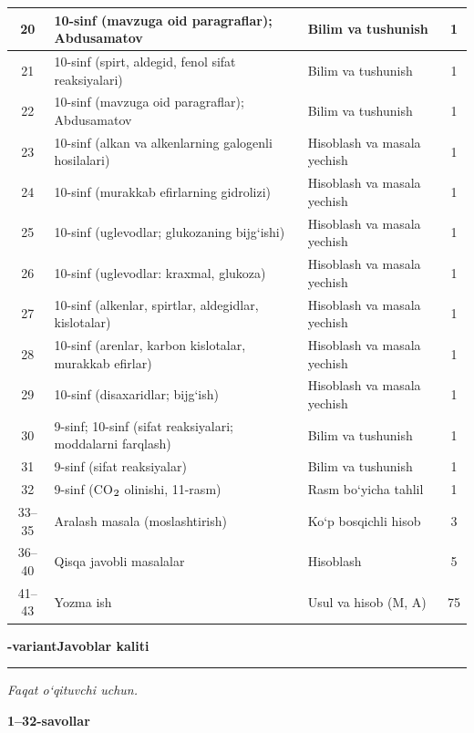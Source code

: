 \documentclass[11pt,a4paper]{article}
\renewcommand{\textsubscript}[1]{\ensuremath{_{\text{\fontsize{8}{8}\selectfont #1}}}}
\newcommand{\hdrpill}[1]{\begin{tikzpicture}[baseline=0pt]\node[fill=ygreen,text=white,rounded corners=8pt,inner xsep=10pt,inner ysep=5pt,font=\fontsize{13}{15}\bfseries\selectfont] at (0,0.475){#1};\end{tikzpicture}}
\newcommand{\curvar}{}\fancyhead[R]{\hdrpill{\curvar}}
\begin{document}
{\begin{longtable}{|c|p{7.2cm}|p{5.4cm}|c|}
20 & 10-sinf (mavzuga oid paragraflar); Abdusamatov & Bilim va tushunish & 1\\\hline
21 & 10-sinf (spirt, aldegid, fenol sifat reaksiyalari) & Bilim va tushunish & 1\\\hline
22 & 10-sinf (mavzuga oid paragraflar); Abdusamatov & Bilim va tushunish & 1\\\hline
23 & 10-sinf (alkan va alkenlarning galogenli hosilalari) & Hisoblash va masala yechish & 1\\\hline
24 & 10-sinf (murakkab efirlarning gidrolizi) & Hisoblash va masala yechish & 1\\\hline
25 & 10-sinf (uglevodlar; glukozaning bijg`ishi) & Hisoblash va masala yechish & 1\\\hline
26 & 10-sinf (uglevodlar: kraxmal, glukoza) & Hisoblash va masala yechish & 1\\\hline
27 & 10-sinf (alkenlar, spirtlar, aldegidlar, kislotalar) & Hisoblash va masala yechish & 1\\\hline
28 & 10-sinf (arenlar, karbon kislotalar, murakkab efirlar) & Hisoblash va masala yechish & 1\\\hline
29 & 10-sinf (disaxaridlar; bijg`ish) & Hisoblash va masala yechish & 1\\\hline
30 & 9-sinf; 10-sinf (sifat reaksiyalari; moddalarni farqlash) & Bilim va tushunish & 1\\\hline
31 & 9-sinf (sifat reaksiyalar) & Bilim va tushunish & 1\\\hline
32 & 9-sinf (CO\textsubscript{2} olinishi, 11-rasm) & Rasm bo`yicha tahlil & 1\\\hline
33--35 & Aralash masala (moslashtirish) & Ko`p bosqichli hisob & 3\\\hline
36--40 & Qisqa javobli masalalar & Hisoblash & 5\\\hline
41--43 & Yozma ish & Usul va hisob (M, A) & 75\\\hline
\end{longtable}}
\renewcommand{\curvar}{Javoblar}
\newpage
\noindent\textbf{\fontsize{13}{15}-variant}\hfill \textbf{Javoblar kaliti}\par\smallskip\hrule\smallskip
\textit{Faqat o`qituvchi uchun.}\par\medskip
\noindent\textbf{1--32-savollar}\par\smallskip
\end{document}
